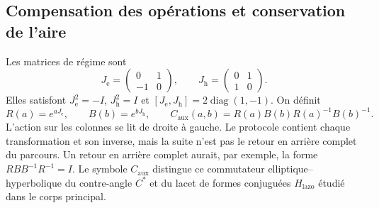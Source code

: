 \subsection{Compensation des opérations et conservation de l’aire}
\label{md:aux:conmutador}

Les matrices de régime sont
\begin{equation}
 J_{\mathrm e}=\begin{pmatrix}0&1\\-1&0\end{pmatrix},\qquad
 J_{\mathrm h}=\begin{pmatrix}0&1\\1&0\end{pmatrix}.
 \label{md:aux:regimenes}
\end{equation}
Elles satisfont $J_{\mathrm e}^2=-I$, $J_{\mathrm h}^2=I$ et
$[J_{\mathrm e},J_{\mathrm h}]=2\operatorname{diag}(1,-1)$.
On définit
\begin{equation}
 R(a)=e^{aJ_{\mathrm e}},\qquad B(b)=e^{bJ_{\mathrm h}},\qquad
 C_{\mathrm{aux}}(a,b)=R(a)B(b)R(a)^{-1}B(b)^{-1}.
 \label{md:aux:def-compensado}
\end{equation}
L’action sur les colonnes se lit de droite à gauche. Le protocole
contient chaque transformation et son inverse, mais la suite n’est pas
le retour en arrière complet du parcours. Un retour en arrière complet aurait,
par exemple, la forme $RBB^{-1}R^{-1}=I$. Le symbole
$C_{\mathrm{aux}}$ distingue ce commutateur elliptique--hyperbolique
du contre-angle $C^*$ et du lacet de formes conjuguées
$H_{\mathrm{lazo}}$ étudié dans le corps principal.

